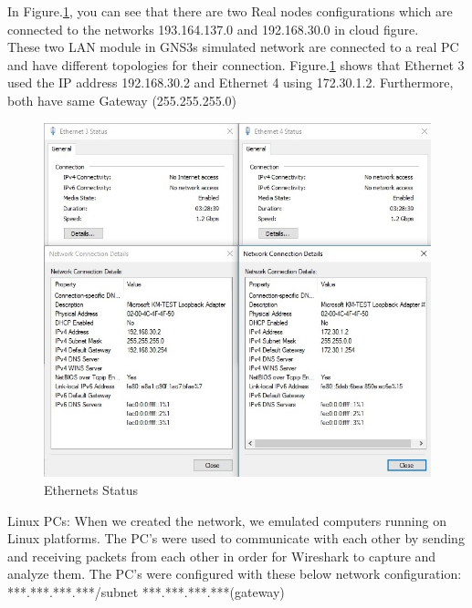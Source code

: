 \documentclass{article}
\begin{document}
In Figure.\ref{fig:StatusEth}, you can see that there are two Real nodes configurations which are connected to the networks 193.164.137.0 and 192.168.30.0 in cloud figure.\\


These two LAN module in GNS3s simulated network are connected to a real PC and have different topologies for their connection. Figure.\ref{fig:StatusEth} shows that Ethernet 3 used the IP address 192.168.30.2 and Ethernet 4 using 172.30.1.2. Furthermore, both have same Gateway (255.255.255.0)


\begin{figure}[H]
	\begin{center}
		\includegraphics[width=0.6
\textwidth]{Ethernet.jpg}
	\end{center}
	\caption{\small Ethernets Status \newline}
	\label{fig:StatusEth}
\end{figure}


Linux PCs: When we created the network, we emulated computers running on Linux platforms. The PC's were used to communicate with each other by sending and receiving packets from each other in order for Wireshark to capture and analyze them. The PC's were configured with these below network configuration:\newline
***.***.***.***/subnet\newline
***.***.***.***(gateway)
\end{document}
